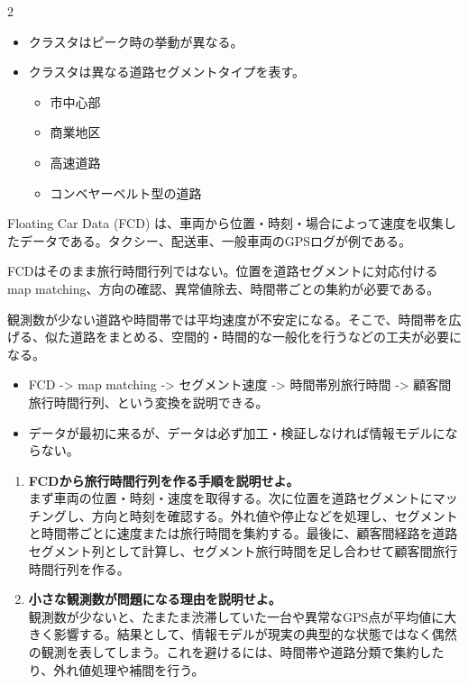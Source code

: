 \clearpage
{}
\begin{multicols}{2}\footnotesize\raggedcolumns
{}
\begin{itemize}
\item クラスタはピーク時の挙動が異なる。
\item クラスタは異なる道路セグメントタイプを表す。
\begin{itemize}
\item 市中心部
\item 商業地区
\item 高速道路
\item コンベヤーベルト型の道路
\end{itemize}
\end{itemize}
Floating Car Data (FCD) は、車両から位置・時刻・場合によって速度を収集したデータである。タクシー、配送車、一般車両のGPSログが例である。\par

FCDはそのまま旅行時間行列ではない。位置を道路セグメントに対応付ける map matching、方向の確認、異常値除去、時間帯ごとの集約が必要である。\par

観測数が少ない道路や時間帯では平均速度が不安定になる。そこで、時間帯を広げる、似た道路をまとめる、空間的・時間的な一般化を行うなどの工夫が必要になる。\par
{}
\begin{itemize}
\item FCD -> map matching -> セグメント速度 -> 時間帯別旅行時間 -> 顧客間旅行時間行列、という変換を説明できる。
\item データが最初に来るが、データは必ず加工・検証しなければ情報モデルにならない。
\end{itemize}
\begin{enumerate}
\item \textbf{FCDから旅行時間行列を作る手順を説明せよ。}\\まず車両の位置・時刻・速度を取得する。次に位置を道路セグメントにマッチングし、方向と時刻を確認する。外れ値や停止などを処理し、セグメントと時間帯ごとに速度または旅行時間を集約する。最後に、顧客間経路を道路セグメント列として計算し、セグメント旅行時間を足し合わせて顧客間旅行時間行列を作る。
\item \textbf{小さな観測数が問題になる理由を説明せよ。}\\観測数が少ないと、たまたま渋滞していた一台や異常なGPS点が平均値に大きく影響する。結果として、情報モデルが現実の典型的な状態ではなく偶然の観測を表してしまう。これを避けるには、時間帯や道路分類で集約したり、外れ値処理や補間を行う。
\end{enumerate}
\end{multicols}


